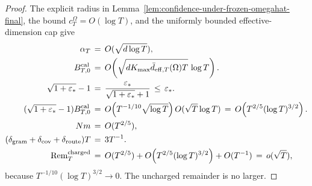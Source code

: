 \documentclass{article} %
\begin{document}
\begin{proof}
The explicit radius in
Lemma~\ref{lem:confidence-under-frozen-omegahat-final}, the bound
\(c_T^\Omega=O(\log T)\), and the uniformly bounded effective-dimension cap
give
\begin{equation}
\begin{aligned}
\alpha_T
&\,=\,
O(\sqrt{d\log T}),
\\
B_{T,0}^{\rm cal}
&\,=\,
O\!\left(
\sqrt{dK_{\max}\bar d_{\mathrm{eff},T}(\Omega)T}\,\log T
\right).
\\
\sqrt{1+\varepsilon_*}-1
&\,=\,
\frac{\varepsilon_*}{\sqrt{1+\varepsilon_*}+1}
\,\leq\,
\varepsilon_*.
\\
(\sqrt{1+\varepsilon_*}-1)B_{T,0}^{\rm cal}
&\,=\,
O\!\left(T^{-1/10}\sqrt{\log T}\right)
O(\sqrt{T}\log T)
\,=\,
O\!\left(T^{2/5}(\log T)^{3/2}\right).
\\
Nm
&\,=\,
O(T^{2/5}),
\\
(\delta_{\rm gram}+\delta_{\rm cov}+\delta_{\rm route})T
&\,=\,
3T^{-1}.
\\
\operatorname{Rem}_T^{\rm charged}
&\,=\,
O(T^{2/5})
+
O\!\left(T^{2/5}(\log T)^{3/2}\right)
+
O(T^{-1})
\,=\,
o(\sqrt T),
\end{aligned}
\end{equation}
because
\(T^{-1/10}(\log T)^{3/2}\to0\). The uncharged remainder is no larger.
\end{proof}



\end{document}
